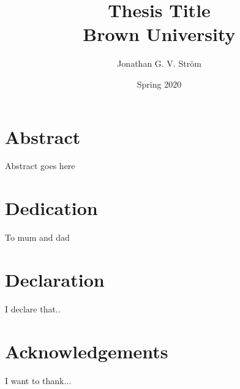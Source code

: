 \documentclass[12pt,twoside]{report}
\begin{document}
\title{
{Thesis Title}\\ %
{\large Brown University}\\
}
\author{Jonathan G. V. Ström}
\date{Spring 2020}

\maketitle

\chapter*{Abstract}
Abstract goes here





\chapter*{Dedication}
To mum and dad

\chapter*{Declaration}
I declare that..

\chapter*{Acknowledgements}
I want to thank...

\tableofcontents{}





\appendix
\end{document}
